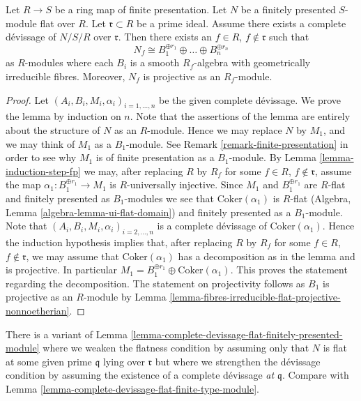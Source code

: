 \begin{lemma}
\label{lemma-complete-devissage-flat-finitely-presented-module}
Let $R \to S$ be a ring map of finite presentation.
Let $N$ be a finitely presented $S$-module flat over $R$.
Let $\mathfrak r \subset R$ be a prime ideal.
Assume there exists a complete d\'evissage of $N/S/R$ over $\mathfrak r$.
Then there exists an $f \in R$, $f \not \in \mathfrak r$
such that
$$
N_f \cong B_1^{\oplus r_1} \oplus \ldots \oplus B_n^{\oplus r_n}
$$
as $R$-modules where each $B_i$ is a smooth $R_f$-algebra with geometrically
irreducible fibres. Moreover, $N_f$ is projective as an $R_f$-module.
\end{lemma}

\begin{proof}
Let $(A_i, B_i, M_i, \alpha_i)_{i = 1, \ldots, n}$ be the given
complete d\'evissage. We prove the lemma by induction on $n$.
Note that the assertions of the lemma are entirely about the structure
of $N$ as an $R$-module. Hence we may replace $N$ by $M_1$, and we
may think of $M_1$ as a $B_1$-module. See
Remark \ref{remark-finite-presentation}
in order to see why $M_1$ is of finite presentation as a $B_1$-module. By
Lemma \ref{lemma-induction-step-fp}
we may, after replacing $R$ by $R_f$ for some
$f \in R$, $f \not \in \mathfrak r$, assume
the map $\alpha_1 : B_1^{\oplus r_1} \to M_1$ is $R$-universally injective.
Since $M_1$ and $B_1^{\oplus r_1}$ are $R$-flat and finitely presented as
$B_1$-modules we see that $\text{Coker}(\alpha_1)$ is $R$-flat
(Algebra, Lemma \ref{algebra-lemma-ui-flat-domain})
and finitely presented as a $B_1$-module. Note that
$(A_i, B_i, M_i, \alpha_i)_{i = 2, \ldots, n}$ is a complete
d\'evissage of $\text{Coker}(\alpha_1)$. Hence the induction hypothesis
implies that, after replacing
$R$ by $R_f$ for some $f \in R$, $f \not \in \mathfrak r$,
we may assume that $\text{Coker}(\alpha_1)$ has a decomposition
as in the lemma and is projective. In particular
$M_1 = B_1^{\oplus r_1} \oplus \text{Coker}(\alpha_1)$.
This proves the statement regarding the decomposition.
The statement on projectivity follows as $B_1$ is projective as
an $R$-module by
Lemma \ref{lemma-fibres-irreducible-flat-projective-nonnoetherian}.
\end{proof}

\begin{remark}
\label{remark-complete-devissage-flat-finitely-presented-module}
There is a variant of
Lemma \ref{lemma-complete-devissage-flat-finitely-presented-module}
where we weaken the flatness condition by assuming only that $N$
is flat at some given prime $\mathfrak q$ lying over $\mathfrak r$
but where we strengthen the d\'evissage condition by assuming
the existence of a complete d\'evissage {\it at $\mathfrak q$}. Compare with
Lemma \ref{lemma-complete-devissage-flat-finite-type-module}.
\end{remark}

